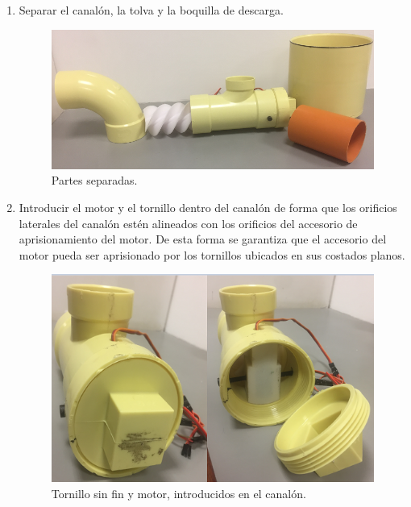 \begin{enumerate}
    \item Separar el canalón, la tolva y  la boquilla de descarga.
        \begin{figure}[H]
            \begin{center}
            	\includegraphics[scale=0.6]{img/separados2.png}
            \end{center}
        \caption{Partes separadas. \label{}}
        \end{figure}
    \item Introducir el motor y el tornillo dentro del canalón de forma que los orificios laterales del canalón estén alineados con los orificios del accesorio de aprisionamiento del motor. De esta forma se garantiza que el accesorio del motor pueda ser aprisionado por los tornillos ubicados en sus costados planos.
        \begin{figure}[H]
            \begin{center}
            	\includegraphics[scale=0.6]{img/ptorni2.png}
            \end{center}
        \caption{Tornillo sin fin y motor, introducidos en el canalón. \label{}}

\end{figure}
\end{enumerate}
